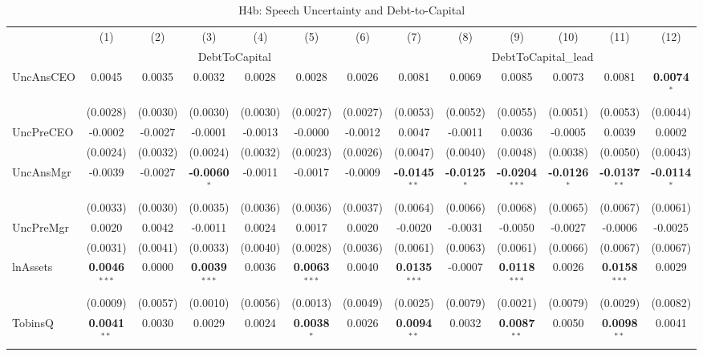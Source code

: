 \documentclass[11pt,a4paper]{article}
\begin{document}
\begin{table}[htbp]
\centering
\caption{H4b: Speech Uncertainty and Debt-to-Capital}
\label{tab:h4b}
\scriptsize
\begin{tabular}{lcccccccccccc}
\toprule
 & (1) & (2) & (3) & (4) & (5) & (6) & (7) & (8) & (9) & (10) & (11) & (12) \\
 & \multicolumn{6}{c}{DebtToCapital} & \multicolumn{6}{c}{DebtToCapital\_lead} \\
\cmidrule(lr){2-7} \cmidrule(lr){8-13}
\midrule
UncAnsCEO & 0.0045 & 0.0035 & 0.0032 & 0.0028 & 0.0028 & 0.0026 & 0.0081 & 0.0069 & 0.0085 & 0.0073 & 0.0081 & \textbf{0.0074}$^{*}$ \\
 & (0.0028) & (0.0030) & (0.0030) & (0.0030) & (0.0027) & (0.0027) & (0.0053) & (0.0052) & (0.0055) & (0.0051) & (0.0053) & (0.0044) \\
UncPreCEO & -0.0002 & -0.0027 & -0.0001 & -0.0013 & -0.0000 & -0.0012 & 0.0047 & -0.0011 & 0.0036 & -0.0005 & 0.0039 & 0.0002 \\
 & (0.0024) & (0.0032) & (0.0024) & (0.0032) & (0.0023) & (0.0026) & (0.0047) & (0.0040) & (0.0048) & (0.0038) & (0.0050) & (0.0043) \\
UncAnsMgr & -0.0039 & -0.0027 & \textbf{-0.0060}$^{*}$ & -0.0011 & -0.0017 & -0.0009 & \textbf{-0.0145}$^{**}$ & \textbf{-0.0125}$^{*}$ & \textbf{-0.0204}$^{***}$ & \textbf{-0.0126}$^{*}$ & \textbf{-0.0137}$^{**}$ & \textbf{-0.0114}$^{*}$ \\
 & (0.0033) & (0.0030) & (0.0035) & (0.0036) & (0.0036) & (0.0037) & (0.0064) & (0.0066) & (0.0068) & (0.0065) & (0.0067) & (0.0061) \\
UncPreMgr & 0.0020 & 0.0042 & -0.0011 & 0.0024 & 0.0017 & 0.0020 & -0.0020 & -0.0031 & -0.0050 & -0.0027 & -0.0006 & -0.0025 \\
 & (0.0031) & (0.0041) & (0.0033) & (0.0040) & (0.0028) & (0.0036) & (0.0061) & (0.0063) & (0.0061) & (0.0066) & (0.0067) & (0.0067) \\
\midrule
lnAssets & \textbf{0.0046}$^{***}$ & 0.0000 & \textbf{0.0039}$^{***}$ & 0.0036 & \textbf{0.0063}$^{***}$ & 0.0040 & \textbf{0.0135}$^{***}$ & -0.0007 & \textbf{0.0118}$^{***}$ & 0.0026 & \textbf{0.0158}$^{***}$ & 0.0029 \\
 & (0.0009) & (0.0057) & (0.0010) & (0.0056) & (0.0013) & (0.0049) & (0.0025) & (0.0079) & (0.0021) & (0.0079) & (0.0029) & (0.0082) \\
TobinsQ & \textbf{0.0041}$^{**}$ & 0.0030 & 0.0029 & 0.0024 & \textbf{0.0038}$^{*}$ & 0.0026 & \textbf{0.0094}$^{**}$ & 0.0032 & \textbf{0.0087}$^{**}$ & 0.0050 & \textbf{0.0098}$^{**}$ & 0.0041 \\

\end{tabular}
\end{table}
\end{document}

